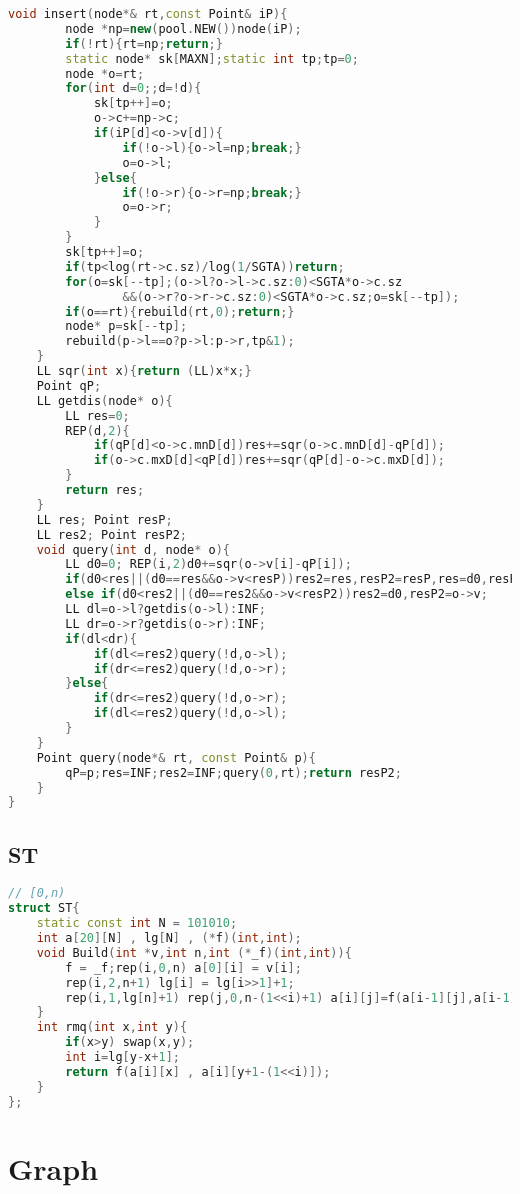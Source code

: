 \begin{lstlisting}[language=C++]
    void insert(node*& rt,const Point& iP){
        node *np=new(pool.NEW())node(iP);
        if(!rt){rt=np;return;}
        static node* sk[MAXN];static int tp;tp=0;
        node *o=rt;
        for(int d=0;;d=!d){
            sk[tp++]=o;
            o->c+=np->c;
            if(iP[d]<o->v[d]){
                if(!o->l){o->l=np;break;}
                o=o->l;
            }else{
                if(!o->r){o->r=np;break;}
                o=o->r;
            }
        }
        sk[tp++]=o;
        if(tp<log(rt->c.sz)/log(1/SGTA))return;
        for(o=sk[--tp];(o->l?o->l->c.sz:0)<SGTA*o->c.sz
                &&(o->r?o->r->c.sz:0)<SGTA*o->c.sz;o=sk[--tp]);
        if(o==rt){rebuild(rt,0);return;}
        node* p=sk[--tp];
        rebuild(p->l==o?p->l:p->r,tp&1);
    }
    LL sqr(int x){return (LL)x*x;}
    Point qP;
    LL getdis(node* o){
        LL res=0;
        REP(d,2){
            if(qP[d]<o->c.mnD[d])res+=sqr(o->c.mnD[d]-qP[d]);
            if(o->c.mxD[d]<qP[d])res+=sqr(qP[d]-o->c.mxD[d]);
        }
        return res;
    }
    LL res; Point resP;
    LL res2; Point resP2;
    void query(int d, node* o){
        LL d0=0; REP(i,2)d0+=sqr(o->v[i]-qP[i]);
        if(d0<res||(d0==res&&o->v<resP))res2=res,resP2=resP,res=d0,resP=o->v;
        else if(d0<res2||(d0==res2&&o->v<resP2))res2=d0,resP2=o->v;
        LL dl=o->l?getdis(o->l):INF;
        LL dr=o->r?getdis(o->r):INF;
        if(dl<dr){
            if(dl<=res2)query(!d,o->l);
            if(dr<=res2)query(!d,o->r);
        }else{
            if(dr<=res2)query(!d,o->r);
            if(dl<=res2)query(!d,o->l);
        }
    }
    Point query(node*& rt, const Point& p){
        qP=p;res=INF;res2=INF;query(0,rt);return resP2;
    }
}
\end{lstlisting}
\subsection{ST}
\begin{lstlisting}[language=C++]
// [0,n)
struct ST{
    static const int N = 101010;
    int a[20][N] , lg[N] , (*f)(int,int);
    void Build(int *v,int n,int (*_f)(int,int)){
        f = _f;rep(i,0,n) a[0][i] = v[i];
        rep(i,2,n+1) lg[i] = lg[i>>1]+1;
        rep(i,1,lg[n]+1) rep(j,0,n-(1<<i)+1) a[i][j]=f(a[i-1][j],a[i-1][j+(1<<i>>1)]);
    }
    int rmq(int x,int y){
        if(x>y) swap(x,y);
        int i=lg[y-x+1];
        return f(a[i][x] , a[i][y+1-(1<<i)]);
    }
};
\end{lstlisting}

\section{Graph}

